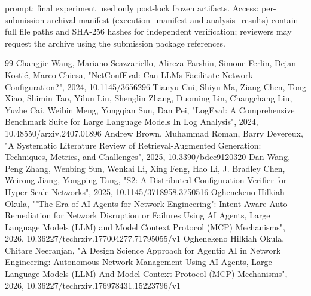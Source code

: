 \documentclass[conference]{IEEEtran}
\begin{document}
prompt; final experiment used only post-lock frozen artifacts. Access: per-submission archival manifest (execution\_manifest and analysis\_results) contain full file paths and SHA-256 hashes for independent verification; reviewers may request the archive using the submission package references.

\begin{thebibliography}{99}
 Changjie Wang, Mariano Scazzariello, Alireza Farshin, Simone Ferlin, Dejan Kostić, Marco Chiesa, "NetConfEval: Can LLMs Facilitate Network Configuration?", 2024, 10.1145/3656296
 Tianyu Cui, Shiyu Ma, Ziang Chen, Tong Xiao, Shimin Tao, Yilun Liu, Shenglin Zhang, Duoming Lin, Changchang Liu, Yuzhe Cai, Weibin Meng, Yongqian Sun, Dan Pei, "LogEval: A Comprehensive Benchmark Suite for Large Language Models In Log Analysis", 2024, 10.48550/arxiv.2407.01896
 Andrew Brown, Muhammad Roman, Barry Devereux, "A Systematic Literature Review of Retrieval-Augmented Generation: Techniques, Metrics, and Challenges", 2025, 10.3390/bdcc9120320
 Dan Wang, Peng Zhang, Wenbing Sun, Wenkai Li, Xing Feng, Hao Li, J. Bradley Chen, Weirong Jiang, Yongping Tang, "S2: A Distributed Configuration Verifier for Hyper-Scale Networks", 2025, 10.1145/3718958.3750516
 Oghenekeno Hilkiah Okula, ""The Era of AI Agents for Network Engineering": Intent-Aware Auto Remediation for Network Disruption or Failures Using AI Agents, Large Language Models (LLM) and Model Context Protocol (MCP) Mechanisms", 2026, 10.36227/techrxiv.177004277.71795055/v1
 Oghenekeno Hilkiah Okula, Chitare Neeranjan, "A Design Science Approach for Agentic AI in Network Engineering: Autonomous Network Management Using AI Agents, Large Language Models (LLM) And Model Context Protocol (MCP) Mechanisms", 2026, 10.36227/techrxiv.176978431.15223796/v1
\end{thebibliography}
\end{document}
